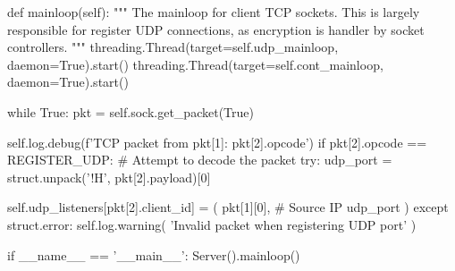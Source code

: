 \begin{pythoncode}
    def mainloop(self):
        """
        The mainloop for client TCP sockets. This is largely responsible for
        register UDP connections, as encryption is handler by socket
        controllers.
        """
        threading.Thread(target=self.udp_mainloop, daemon=True).start()
        threading.Thread(target=self.cont_mainloop, daemon=True).start()

        while True:
            pkt = self.sock.get_packet(True)

            self.log.debug(f'TCP packet from {pkt[1]}: {pkt[2].opcode}')
            if pkt[2].opcode == REGISTER_UDP:
                # Attempt to decode the packet
                try:
                    udp_port = struct.unpack('!H', pkt[2].payload)[0]

                    self.udp_listeners[pkt[2].client_id] = (
                        pkt[1][0],  # Source IP
                        udp_port
                    )
                except struct.error:
                    self.log.warning(
                        'Invalid packet when registering UDP port'
                    )


if __name__ == '__main__':
    Server().mainloop()
\end{pythoncode}
